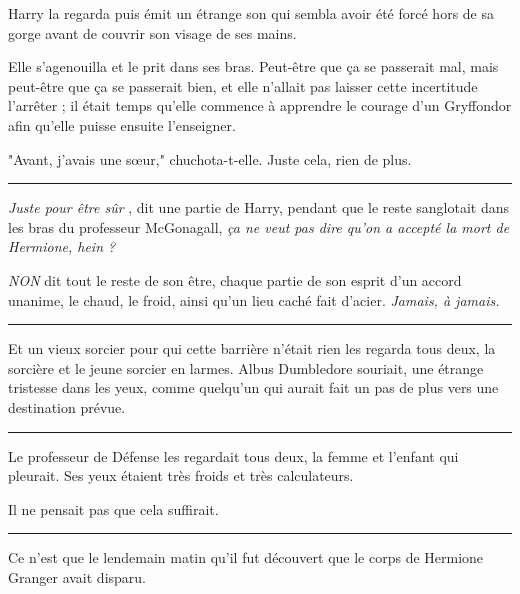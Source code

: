 Harry la regarda puis émit un étrange son qui sembla avoir été forcé hors de sa gorge avant de couvrir son visage de ses mains.

Elle s'agenouilla et le prit dans ses bras. Peut-être que ça se passerait mal, mais peut-être que ça se passerait bien, et elle n'allait pas laisser cette incertitude l'arrêter ; il était temps qu'elle commence à apprendre le courage d'un Gryffondor afin qu'elle puisse ensuite l'enseigner.

"Avant, j'avais une sœur," chuchota-t-elle. Juste cela, rien de plus.
\par\noindent\rule{\textwidth}{0.4pt}
\emph{Juste pour être sûr} , dit une partie de Harry, pendant que le reste sanglotait dans les bras du professeur McGonagall, \emph{ça ne veut pas dire qu'on a accepté la mort de Hermione, hein ?} 

\emph{NON}  dit tout le reste de son être, chaque partie de son esprit d'un accord unanime, le chaud, le froid, ainsi qu'un lieu caché fait d'acier. \emph{Jamais, à jamais.} 
\par\noindent\rule{\textwidth}{0.4pt}
Et un vieux sorcier pour qui cette barrière n'était rien les regarda tous deux, la sorcière et le jeune sorcier en larmes. Albus Dumbledore souriait, une étrange tristesse dans les yeux, comme quelqu'un qui aurait fait un pas de plus vers une destination prévue.
\par\noindent\rule{\textwidth}{0.4pt}
Le professeur de Défense les regardait tous deux, la femme et l'enfant qui pleurait. Ses yeux étaient très froids et très calculateurs.

Il ne pensait pas que cela suffirait.
\par\noindent\rule{\textwidth}{0.4pt}
Ce n'est que le lendemain matin qu'il fut découvert que le corps de Hermione Granger avait disparu.

